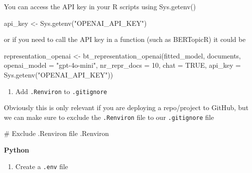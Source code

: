\documentclass[
  letterpaper,
  DIV=11,
  numbers=noendperiod]{scrreprt}
\newenvironment{Shaded}{\begin{snugshade}}{\end{snugshade}}
\newcommand{\AttributeTok}[1]{\textcolor[rgb]{0.40,0.45,0.13}{#1}}
\newcommand{\CommentTok}[1]{\textcolor[rgb]{0.37,0.37,0.37}{#1}}
\newcommand{\ConstantTok}[1]{\textcolor[rgb]{0.56,0.35,0.01}{#1}}
\newcommand{\DecValTok}[1]{\textcolor[rgb]{0.68,0.00,0.00}{#1}}
\newcommand{\FunctionTok}[1]{\textcolor[rgb]{0.28,0.35,0.67}{#1}}
\newcommand{\NormalTok}[1]{\textcolor[rgb]{0.00,0.23,0.31}{#1}}
\newcommand{\OtherTok}[1]{\textcolor[rgb]{0.00,0.23,0.31}{#1}}
\newcommand{\StringTok}[1]{\textcolor[rgb]{0.13,0.47,0.30}{#1}}
\providecommand{\tightlist}{%
  \setlength{\itemsep}{0pt}\setlength{\parskip}{0pt}}\usepackage{longtable,booktabs,array}
\begin{document}
\begin{tcolorbox}
You can access the API key in your R scripts using Sys.getenv()

\begin{Shaded}
\begin{Highlighting}[]
\NormalTok{api\_key }\OtherTok{\textless{}{-}} \FunctionTok{Sys.getenv}\NormalTok{(}\StringTok{"OPENAI\_API\_KEY"}\NormalTok{)}
\end{Highlighting}
\end{Shaded}

or if you need to call the API key in a function (such as BERTopicR) it
could be

\begin{Shaded}
\begin{Highlighting}[]
\NormalTok{representation\_openai }\OtherTok{\textless{}{-}} \FunctionTok{bt\_representation\_openai}\NormalTok{(fitted\_model,}
\NormalTok{                                                  documents,}
                                                  \AttributeTok{openai\_model =} \StringTok{"gpt{-}4o{-}mini"}\NormalTok{,}
                                                  \AttributeTok{nr\_repr\_docs =} \DecValTok{10}\NormalTok{,}
                                                  \AttributeTok{chat =} \ConstantTok{TRUE}\NormalTok{,}
                                                  \AttributeTok{api\_key =} \FunctionTok{Sys.getenv}\NormalTok{(}\StringTok{"OPENAI\_API\_KEY"}\NormalTok{))}
\end{Highlighting}
\end{Shaded}

\begin{enumerate}
\def\labelenumi{\arabic{enumi}.}
\setcounter{enumi}{2}
\tightlist
\item
  Add \texttt{.Renviron} to \texttt{.gitignore}
\end{enumerate}

Obviously this is only relevant if you are deploying a repo/project to
GitHub, but we can make sure to exclude the \texttt{.Renviron} file to
our \texttt{.gitignore} file

\begin{Shaded}
\begin{Highlighting}[]
\CommentTok{\# Exclude .Renviron file}
\NormalTok{.Renviron}
\end{Highlighting}
\end{Shaded}

\textbf{Python}

\begin{enumerate}
\def\labelenumi{\arabic{enumi}.}
\tightlist
\item
  Create a \texttt{.env} file
\end{enumerate}


\end{tcolorbox}
\end{document}
